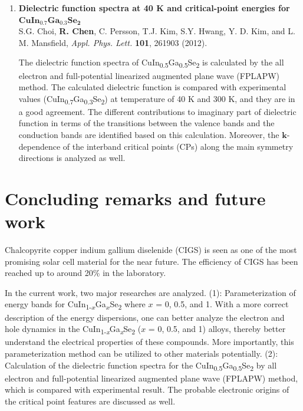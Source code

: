 \documentclass[a4paper, 12pt, titlepage,oneside,drop]{kthesis}
\begin{document}
\begin{enumerate}
\item{} \textbf{Dielectric function spectra at 40 K and critical-point energies for $\mathbf {CuIn_{0.7}Ga_{0.3}Se_2}$}
\\ S.G. Choi, \textbf{R. Chen}, C. Persson, T.J. Kim, S.Y. Hwang, Y. D. Kim, and L. M. Mansfield,
\textit{Appl. Phys. Lett. } {\textbf {101}}, 261903 (2012).

The dielectric function spectra of CuIn\textsubscript{0.5}Ga\textsubscript{0.5}Se\textsubscript{2} is calculated by the all electron
and full-potential linearized augmented plane wave (FPLAPW) method. The calculated dielectric function is compared with experimental values (CuIn\textsubscript{0.7}Ga\textsubscript{0.3}Se\textsubscript{2}) at temperature 
of 40 K and 300 K, and they are in a good agreement. The different contributions to imaginary part of dielectric function in terms of the transitions between the valence bands and the conduction bands are identified based on this
calculation. Moreover, the $\textbf{k}$-dependence of the interband critical points (CPs) along the main symmetry directions is analyzed as well.


\end{enumerate}



\chapter{Concluding remarks and future work}
Chalcopyrite copper indium gallium diselenide (CIGS) is seen as one of the most promising solar cell material for the near future. The efficiency of CIGS has been reached up to around 20\% in the laboratory. 

In the current work, two major researches are analyzed. (1): Parameterization of energy bands for CuIn{\textsubscript{1-$x$}}Ga{\textsubscript{$x$}}Se\textsubscript{2} where $x$ = 0, 0.5, and 1. With a more correct
description of the energy dispersions, one can better analyze the electron and hole dynamics in the CuIn\textsubscript{1-\textit{x}}Ga\textsubscript{\textit{x}}Se\textsubscript{2} ($x$ = 0, 0.5, and 1) alloys, thereby better
understand the electrical properties of these compounds. More importantly, this parameterization method can be utilized to other materials potentially. (2): Calculation of the dielectric function spectra for the
CuIn{\textsubscript{0.5}}Ga{\textsubscript{0.5}}Se\textsubscript{2} by all electron and full-potential linearized augmented plane wave (FPLAPW) method, which is compared with experimental result. The probable electronic origins of
the critical point features are discussed as well.
\end{document}
